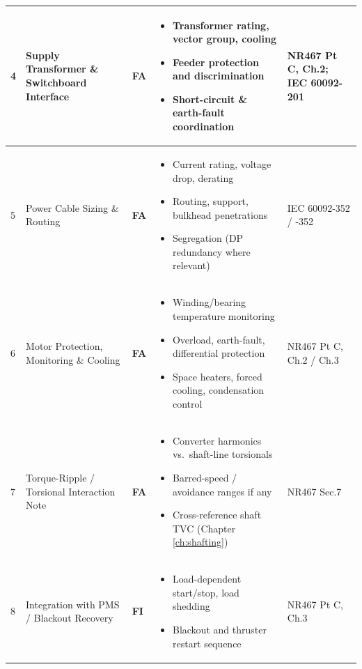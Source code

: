 \documentclass[11pt,a4paper]{report}
\newcommand{\fa}{\textbf{\textcolor{warningred}{FA}}}
\newcommand{\fic}{\textbf{\textcolor{bvgray}{FI}}}
\begin{document}
\begin{longtable}{|p{0.5cm}|p{5cm}|p{1.5cm}|p{5.5cm}|p{2cm}|}
4 & Supply Transformer \& Switchboard Interface & \fa{} &
\begin{itemize}[leftmargin=*,nosep]
\item Transformer rating, vector group, cooling
\item Feeder protection and discrimination
\item Short-circuit \& earth-fault coordination
\end{itemize} & NR467 Pt C, Ch.2; IEC 60092-201 \\
\hline

5 & Power Cable Sizing \& Routing & \fa{} &
\begin{itemize}[leftmargin=*,nosep]
\item Current rating, voltage drop, derating
\item Routing, support, bulkhead penetrations
\item Segregation (DP redundancy where relevant)
\end{itemize} & IEC 60092-352 / -352 \\
\hline

6 & Motor Protection, Monitoring \& Cooling & \fa{} &
\begin{itemize}[leftmargin=*,nosep]
\item Winding/bearing temperature monitoring
\item Overload, earth-fault, differential protection
\item Space heaters, forced cooling, condensation control
\end{itemize} & NR467 Pt C, Ch.2 / Ch.3 \\
\hline

7 & Torque-Ripple / Torsional Interaction Note & \fa{} &
\begin{itemize}[leftmargin=*,nosep]
\item Converter harmonics vs.\ shaft-line torsionals
\item Barred-speed / avoidance ranges if any
\item Cross-reference shaft TVC (Chapter \ref{ch:shafting})
\end{itemize} & NR467 Sec.7 \\
\hline

8 & Integration with PMS / Blackout Recovery & \fic{} &
\begin{itemize}[leftmargin=*,nosep]
\item Load-dependent start/stop, load shedding
\item Blackout and thruster restart sequence
\end{itemize} & NR467 Pt C, Ch.3 \\
\hline

\end{longtable}
\end{document}
